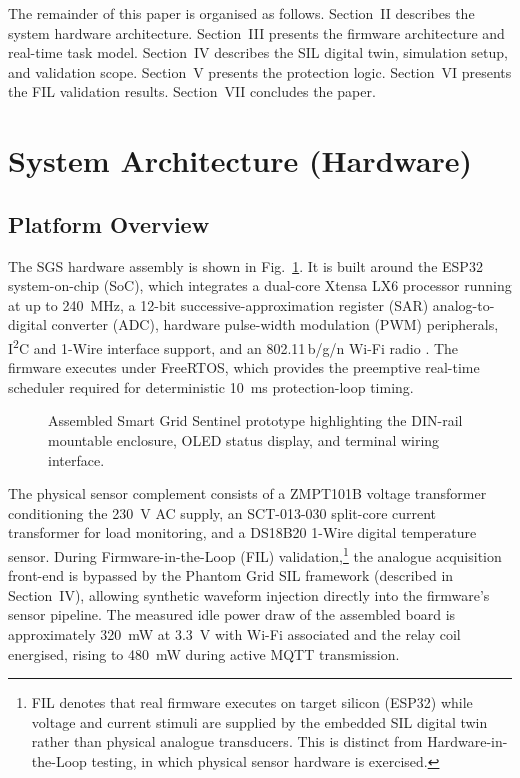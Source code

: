 \documentclass[conference]{IEEEtran}
\begin{document}
The remainder of this paper is organised as follows.
Section~II describes the system hardware architecture.
Section~III presents the firmware architecture and real-time task model.
Section~IV describes the SIL digital twin, simulation setup, and
validation scope.
Section~V presents the protection logic.
Section~VI presents the FIL validation results.
Section~VII concludes the paper.

\section{System Architecture (Hardware)}

\subsection{Platform Overview}

The SGS hardware assembly is shown in Fig.~\ref{fig:hardware_photo}.
It is built around the ESP32 system-on-chip (SoC), which
integrates a dual-core Xtensa LX6 processor running at up to
\SI{240}{\mega\hertz}, a 12-bit successive-approximation register (SAR)
analog-to-digital converter (ADC), hardware pulse-width modulation (PWM)
peripherals, I\textsuperscript{2}C and 1-Wire interface support, and an
802.11\,b/g/n Wi-Fi radio \cite{esp32}.  The firmware executes under
FreeRTOS, which provides the preemptive real-time scheduler required for
deterministic \SI{10}{\milli\second} protection-loop timing.

\begin{figure}[t]
  \centering
  \caption{Assembled Smart Grid Sentinel prototype highlighting the
           DIN-rail mountable enclosure, OLED status display, and
           terminal wiring interface.}
  \label{fig:hardware_photo}
\end{figure}

The physical sensor complement consists of a ZMPT101B voltage
transformer conditioning the \SI{230}{\volt} AC supply, an SCT-013-030
split-core current transformer for load monitoring, and a DS18B20
1-Wire digital temperature sensor.  During Firmware-in-the-Loop
(FIL) validation,\footnote{FIL denotes that real firmware executes on
target silicon (ESP32) while voltage and current stimuli are supplied by
the embedded SIL digital twin rather than physical analogue transducers.
This is distinct from Hardware-in-the-Loop testing, in which
physical sensor hardware is exercised.} the analogue acquisition
front-end is bypassed by the Phantom Grid SIL framework (described in
Section~IV), allowing synthetic waveform injection directly into the
firmware's sensor pipeline.  The measured idle power draw of the
assembled board is approximately \SI{320}{\milli\watt} at
\SI{3.3}{\volt} with Wi-Fi associated and the relay coil energised,
rising to \SI{480}{\milli\watt} during active MQTT transmission.
\end{document}
